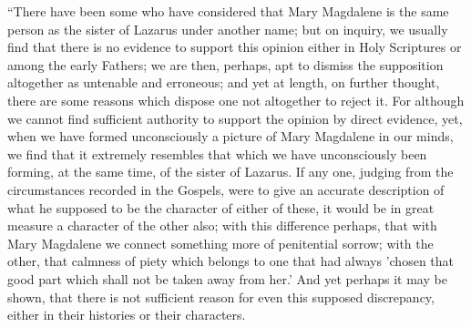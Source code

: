 ``There have been some who have
considered that Mary Magdalene is the same person as the sister of
Lazarus under another name; but on inquiry, we usually find that there
is no evidence to support this opinion either in Holy Scriptures or
among the early Fathers; we are then, perhaps, apt to dismiss the
supposition altogether as untenable and erroneous; and yet at length, on
further thought, there are some reasons which dispose one not altogether
to reject it. For although we cannot find sufficient authority to
support the opinion by direct evidence, yet, when we have formed
unconsciously a picture of Mary Magdalene in our minds, we find that it
extremely resembles that which we have unconsciously been forming, at
the same time, of the sister of Lazarus. If any one, judging from the
circumstances recorded in the Gospels, were to give an accurate
description of what he supposed to be the character of either of these,
it would be in great measure a character of the other also; with this
difference perhaps, that with Mary Magdalene we connect something more
of penitential sorrow; with the other, that calmness of piety which
belongs to one that had always 'chosen that good part which shall not be
taken away from her.' And yet perhaps it may
be shown, that there is not sufficient reason for even this supposed
discrepancy, either in their histories or their characters.

